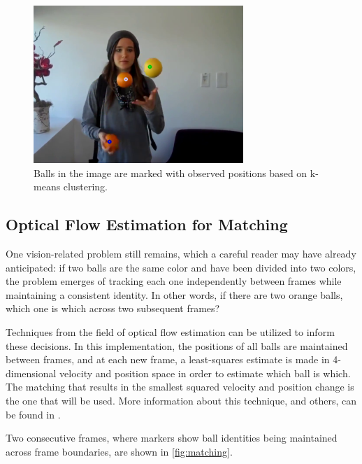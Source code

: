 \documentclass[letterpaper, 10 pt, conference]{ieeeconf}  %
\begin{document}
\begin{figure}
\centering
    \includegraphics{clusters.png}
    \caption{Balls in the image are marked with observed positions based on k-means clustering.}
    \label{fig:clusters}
\end{figure}

\subsection{Optical Flow Estimation for Matching}

One vision-related problem still remains, which a careful reader may have already anticipated: if two balls are the same color and have been divided into two colors, the problem emerges of tracking each one independently between frames while maintaining a consistent identity. In other words, if there are two orange balls, which one is which across two subsequent frames?

Techniques from the field of optical flow estimation can be utilized to inform these decisions. In this implementation, the positions of all balls are maintained between frames, and at each new frame, a least-squares estimate is made in 4-dimensional velocity and position space in order to estimate which ball is which. The matching that results in the smallest squared velocity and position change is the one that will be used. More information about this technique, and others, can be found in \cite{fleet}.

Two consecutive frames, where markers show ball identities being maintained across frame boundaries, are shown in \ref{fig:matching}.
\end{document}
